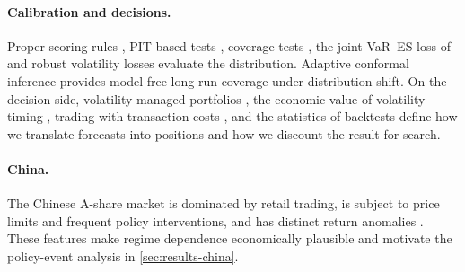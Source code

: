 \paragraph{Calibration and decisions.}
Proper scoring rules \citep{gneiting2007strictly}, PIT-based tests \citep{berkowitz2001testing},
coverage tests \citep{kupiec1995techniques,christoffersen1998evaluating}, the joint VaR--ES loss of
\citet{patton2019dynamic} and robust volatility losses \citep{patton2011volatility} evaluate the
distribution. Adaptive conformal inference \citep{gibbs2021adaptive,gibbs2024conformal} provides
model-free long-run coverage under distribution shift. On the decision side, volatility-managed
portfolios \citep{moreira2017volatility}, the economic value of volatility timing
\citep{fleming2001economic}, trading with transaction costs \citep{garleanu2013dynamic}, and the
statistics of backtests \citep{lo2002statistics,bailey2014deflated,bailey2017probability,white2000reality,hansen2005test}
define how we translate forecasts into positions and how we discount the result for search.

\paragraph{China.} The Chinese A-share market is dominated by retail trading, is subject to
price limits and frequent policy interventions, and has distinct return anomalies
\citep{liu2019size,carpenter2021real}. These features make regime dependence economically plausible and
motivate the policy-event analysis in \cref{sec:results-china}.

